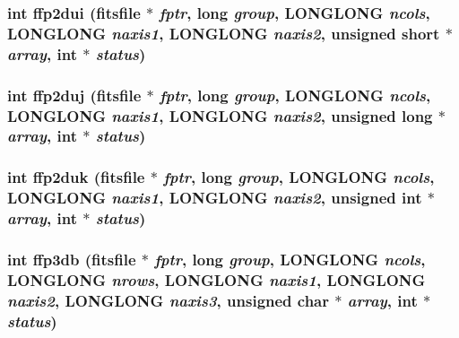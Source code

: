 \subsubsection{\setlength{\rightskip}{0pt plus 5cm}int ffp2dui (\bf{fitsfile} $\ast$ {\em fptr}, long {\em group}, \bf{LONGLONG} {\em ncols}, \bf{LONGLONG} {\em naxis1}, \bf{LONGLONG} {\em naxis2}, unsigned short $\ast$ {\em array}, int $\ast$ {\em status})}\label{test_2shm__client_2fitsio_8h_35a8533785911cfd707b4ec578f431b0}


\subsubsection{\setlength{\rightskip}{0pt plus 5cm}int ffp2duj (\bf{fitsfile} $\ast$ {\em fptr}, long {\em group}, \bf{LONGLONG} {\em ncols}, \bf{LONGLONG} {\em naxis1}, \bf{LONGLONG} {\em naxis2}, unsigned long $\ast$ {\em array}, int $\ast$ {\em status})}\label{test_2shm__client_2fitsio_8h_894a5478ff80f7822a394abc4cac5db3}


\subsubsection{\setlength{\rightskip}{0pt plus 5cm}int ffp2duk (\bf{fitsfile} $\ast$ {\em fptr}, long {\em group}, \bf{LONGLONG} {\em ncols}, \bf{LONGLONG} {\em naxis1}, \bf{LONGLONG} {\em naxis2}, unsigned int $\ast$ {\em array}, int $\ast$ {\em status})}\label{test_2shm__client_2fitsio_8h_7daa3c68214e4bf5e9510489d23c8344}


\subsubsection{\setlength{\rightskip}{0pt plus 5cm}int ffp3db (\bf{fitsfile} $\ast$ {\em fptr}, long {\em group}, \bf{LONGLONG} {\em ncols}, \bf{LONGLONG} {\em nrows}, \bf{LONGLONG} {\em naxis1}, \bf{LONGLONG} {\em naxis2}, \bf{LONGLONG} {\em naxis3}, unsigned char $\ast$ {\em array}, int $\ast$ {\em status})}\label{test_2shm__client_2fitsio_8h_509db23e215c4ac2df334edd78851e1e}


